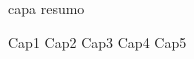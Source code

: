 \documentclass[a4paper,11pt]{abnt}
\begin{document}
 {capa}
 {resumo}
\tableofcontents
\listoffigures
\listoftables

 {Cap1}
 {Cap2}
 {Cap3}
 {Cap4}
 {Cap5}
\end{document}
